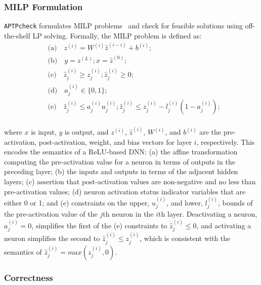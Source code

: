 \documentclass[oneside,11pt,dvipsnames]{book}
\newcommand{\nnproofcheck}{\texttt{APTPcheck}}
\begin{document}
\subsubsection{MILP Formulation}\label{sec:milp}

\nnproofcheck{} formulates MILP problems~\cite{tjeng2019evaluating} and check for feasible solutions using off-the-shelf LP solving. Formally, the MILP problem is defined as:
\begin{equation}
    \begin{aligned}
        &\mbox{(a)}\quad z^{(i)} = W^{(i)} \hat{z}^{(i-i)} + b^{(i)};\\
        &\mbox{(b)}\quad y = z^{(L)};  x = \hat{z}^{(0)}; \\
        &\mbox{(c)}\quad \hat{z}_j^{(i)} \ge {z}_j^{(i)}; \hat{z}_j^{(i)} \ge 0; \\
        &\mbox{(d)}\quad a_j^{(i)} \in \{ 0, 1\} ;\\
        &\mbox{(e)}\quad \hat{z}_j^{(i)} \le {a}_j^{(i)} {u}_j^{(i)}; \hat{z}_j^{(i)} \le {z}_j^{(i)} - {l}_j^{(i)}(1 - {a}_j^{(i)}); \\
    \end{aligned}
    \label{eq:mip}
\end{equation}

\noindent where $x$ is input, $y$ is output, and $z^{(i)}$, $\hat{z}^{(i)}$, $W^{(i)}$, and $b^{(i)}$ are the pre-activation, post-activation, weight, and bias vectors for layer $i$, respectively. 
This encodes the semantics of a ReLU-based DNN:  
(a) the affine transformation computing the pre-activation value for a neuron in terms of outputs in the preceding layer;
(b) the inputs and outputs in terms of the adjacent hidden layers;
(c) assertion that post-activation values are non-negative and no less than pre-activation values;
(d) neuron activation status indicator variables that are either 0 or 1; and
(e) constraints on the upper, $u_j^{(i)}$, and lower, $l_j^{(i)}$, bounds of the pre-activation value of the $j$th neuron in the $i$th layer.
Deactivating a neuron, $a_j^{(i)} = 0$, simplifies the first of the (e) constraints to $\hat{z}_j^{(i)} \le 0$, and activating a neuron simplifies the second to $\hat{z}_j^{(i)} \le z_j^{(i)}$, which is consistent with the semantics of $\hat{z}_j^{(i)} = max(z_j^{(i)},0)$.


\subsubsection{Correctness}\label{sec:checker-core-correctness}
\end{document}
